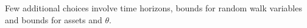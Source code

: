 \documentclass[12pt,letter]{article}
\begin{document}

Few additional choices involve time horizons, bounds for random walk variables and bounds for assets and $\theta$.
\end{document}
